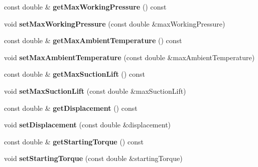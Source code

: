 \begin{DoxyCompactItemize}
\item 
\mbox{\label{class_pump_data_a5689f05afc8a4af00940a7823ebee41c}} 
const double \& {\bfseries get\+Max\+Working\+Pressure} () const
\item 
\mbox{\label{class_pump_data_a5d240f222e2d297f17bc10016bfd7654}} 
void {\bfseries set\+Max\+Working\+Pressure} (const double \&max\+Working\+Pressure)
\item 
\mbox{\label{class_pump_data_ad1074871b12f55e444bb07d62dd43d58}} 
const double \& {\bfseries get\+Max\+Ambient\+Temperature} () const
\item 
\mbox{\label{class_pump_data_a077784050e8dc1c4f864d92af665421a}} 
void {\bfseries set\+Max\+Ambient\+Temperature} (const double \&max\+Ambient\+Temperature)
\item 
\mbox{\label{class_pump_data_a76d158cea0ec42672702d50d963be60f}} 
const double \& {\bfseries get\+Max\+Suction\+Lift} () const
\item 
\mbox{\label{class_pump_data_ab71b920ada4c621985ca52695facbf08}} 
void {\bfseries set\+Max\+Suction\+Lift} (const double \&max\+Suction\+Lift)
\item 
\mbox{\label{class_pump_data_aec5be57ea524ef8ab8a194defc4bafeb}} 
const double \& {\bfseries get\+Displacement} () const
\item 
\mbox{\label{class_pump_data_a5232994893f1a96ffc5dd9d32aee71cc}} 
void {\bfseries set\+Displacement} (const double \&displacement)
\item 
\mbox{\label{class_pump_data_a9a902b2cf5bb17e779be751ff8aa00bc}} 
const double \& {\bfseries get\+Starting\+Torque} () const
\item 
\mbox{\label{class_pump_data_ab9f57e48bce20aa143c6bd5ea2bf9983}} 
void {\bfseries set\+Starting\+Torque} (const double \&starting\+Torque)
\item 
\mbox{\label{class_pump_data_acc1f5864e94a15c36c481a2806122de3}} 

\end{DoxyCompactItemize}
